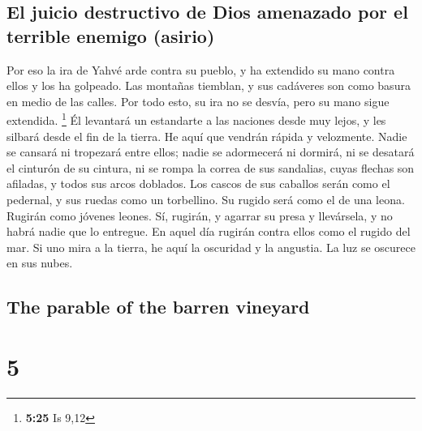 \begin{paracol}{2}
\hypertarget{el-juicio-destructivo-de-dios-amenazado-por-el-terrible-enemigo-asirio}{%
\subsection{El juicio destructivo de Dios amenazado por el terrible
enemigo
(asirio)}\label{el-juicio-destructivo-de-dios-amenazado-por-el-terrible-enemigo-asirio}}

 Por eso la ira de Yahvé arde contra su pueblo, y ha
extendido su mano contra ellos y los ha golpeado. Las montañas tiemblan,
y sus cadáveres son como basura en medio de las calles. Por todo esto,
su ira no se desvía, pero su mano sigue extendida. \footnote{\textbf{5:25}
  Is 9,12}  Él levantará un estandarte a las naciones
desde muy lejos, y les silbará desde el fin de la tierra. He aquí que
vendrán rápida y velozmente.  Nadie se cansará ni
tropezará entre ellos; nadie se adormecerá ni dormirá, ni se desatará el
cinturón de su cintura, ni se rompa la correa de sus sandalias,
 cuyas flechas son afiladas, y todos sus arcos doblados.
Los cascos de sus caballos serán como el pedernal, y sus ruedas como un
torbellino.  Su rugido será como el de una leona. Rugirán
como jóvenes leones. Sí, rugirán, y agarrar su presa y llevársela, y no
habrá nadie que lo entregue.  En aquel día rugirán contra
ellos como el rugido del mar. Si uno mira a la tierra, he aquí la
oscuridad y la angustia. La luz se oscurece en sus nubes.

\switchcolumn
\begin{otherlanguage}{english}

\hypertarget{the-parable-of-the-barren-vineyard}{%
\subsection{The parable of the barren
vineyard}\label{the-parable-of-the-barren-vineyard}}

\hypertarget{section-9}{%
\section{5}\label{section-9}}


\end{otherlanguage}
\end{paracol}
